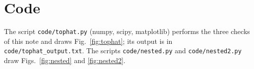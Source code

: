 \documentclass[11pt,a4paper]{article}
\begin{document}
\appendix
\section{Code}
The script \texttt{code/tophat.py} (numpy, scipy, matplotlib) performs the
three checks of this note and draws Fig.~\ref{fig:tophat}; its output is
in \texttt{code/tophat\_output.txt}. The scripts \texttt{code/nested.py} and
\texttt{code/nested2.py} draw Figs.~\ref{fig:nested} and \ref{fig:nested2}.

\end{document}

